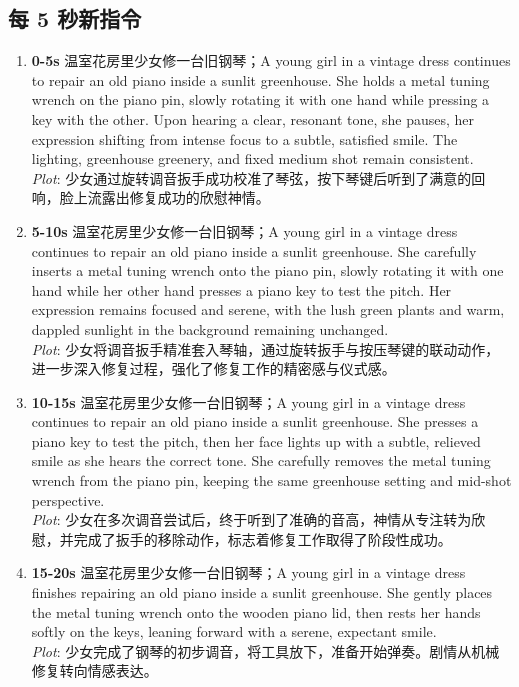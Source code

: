 \documentclass[11pt,a4paper]{article}
\begin{document}
\subsection*{每 5 秒新指令}
\begin{enumerate}
\item \textbf{0-5s} 温室花房里少女修一台旧钢琴；A young girl in a vintage dress continues to repair an old piano inside a sunlit greenhouse. She holds a metal tuning wrench on the piano pin, slowly rotating it with one hand while pressing a key with the other. Upon hearing a clear, resonant tone, she pauses, her expression shifting from intense focus to a subtle, satisfied smile. The lighting, greenhouse greenery, and fixed medium shot remain consistent.\\\newline \textit{Plot}: 少女通过旋转调音扳手成功校准了琴弦，按下琴键后听到了满意的回响，脸上流露出修复成功的欣慰神情。
\item \textbf{5-10s} 温室花房里少女修一台旧钢琴；A young girl in a vintage dress continues to repair an old piano inside a sunlit greenhouse. She carefully inserts a metal tuning wrench onto the piano pin, slowly rotating it with one hand while her other hand presses a piano key to test the pitch. Her expression remains focused and serene, with the lush green plants and warm, dappled sunlight in the background remaining unchanged.\\\newline \textit{Plot}: 少女将调音扳手精准套入琴轴，通过旋转扳手与按压琴键的联动动作，进一步深入修复过程，强化了修复工作的精密感与仪式感。
\item \textbf{10-15s} 温室花房里少女修一台旧钢琴；A young girl in a vintage dress continues to repair an old piano inside a sunlit greenhouse. She presses a piano key to test the pitch, then her face lights up with a subtle, relieved smile as she hears the correct tone. She carefully removes the metal tuning wrench from the piano pin, keeping the same greenhouse setting and mid-shot perspective.\\\newline \textit{Plot}: 少女在多次调音尝试后，终于听到了准确的音高，神情从专注转为欣慰，并完成了扳手的移除动作，标志着修复工作取得了阶段性成功。
\item \textbf{15-20s} 温室花房里少女修一台旧钢琴；A young girl in a vintage dress finishes repairing an old piano inside a sunlit greenhouse. She gently places the metal tuning wrench onto the wooden piano lid, then rests her hands softly on the keys, leaning forward with a serene, expectant smile.\\\newline \textit{Plot}: 少女完成了钢琴的初步调音，将工具放下，准备开始弹奏。剧情从机械修复转向情感表达。

\end{enumerate}
\end{document}
